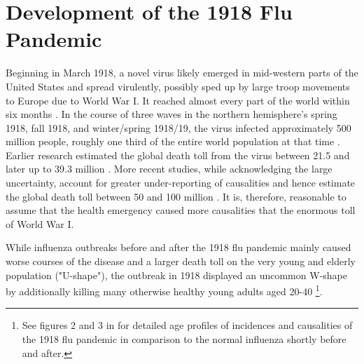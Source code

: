 \documentclass[12pt,a4paper]{article}
\begin{document}
\section{Development of the 1918 Flu Pandemic}


Beginning in March 1918, a novel virus likely emerged in mid-western parts of the United States \citep{barrySiteOrigin19182004} and spread virulently, possibly sped up by large troop movements to Europe due to World War I.
It reached almost every part of the world within six months \citep{pattersonGeographyMortality19181991}.
In the course of three waves in the northern hemisphere's spring 1918, fall 1918, and winter/spring 1918/19, the virus infected approximately 500 million people, roughly one third of the entire world population at that time \citep{taubenberger1918InfluenzaMother2006}.
Earlier research estimated the global death toll from the virus between 21.5 \citep{jordanEpidemicInfluenzaSurvey1927} and later up to 39.3 million \citep{pattersonGeographyMortality19181991}.
More recent studies, while acknowledging the large uncertainty, account for greater under-reporting of causalities and hence estimate the global death toll between 50 and 100 million \citep{johnsonUpdatingAccountsGlobal2002}.
It is, therefore, reasonable to assume that the health emergency caused more causalities that the enormous toll of World War I.

While influenza outbreaks before and after the 1918 flu pandemic mainly caused worse courses of the disease and a larger death toll on the very young and elderly population ("U-shape"),
the outbreak in 1918 displayed an uncommon W-shape by additionally killing many otherwise healthy young adults aged 20-40 \citep{taubenberger1918InfluenzaMother2006}\footnote{
	See figures 2 and 3 in \cite{taubenberger1918InfluenzaMother2006} for detailed age profiles of incidences and causalities of the 1918 flu pandemic in comparison to the normal influenza shortly before and after.}.
\end{document}
